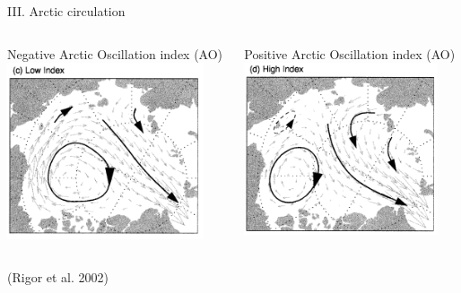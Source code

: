 \documentclass[8pt]{beamer}
\newcommand\Fontvi{\fontsize{6}{7.2}\selectfont}
\begin{document}
\setwatermark{\fontsize{125pt}{125pt}\selectfont{}}
\begin{frame}[fragile]{III. Arctic circulation}
	\begin{columns}
		Negative Arctic Oscillation index (AO)
		\includegraphics[width=0.9\textwidth]{./img/LowAO_Rigor.PNG}

		Positive Arctic Oscillation index (AO)	\includegraphics[width=0.9\textwidth]{./img/HighAO_Rigor.PNG}\\

\end{columns}
\Fontvi
(Rigor et al. 2002)
\end{frame}
\end{document}
